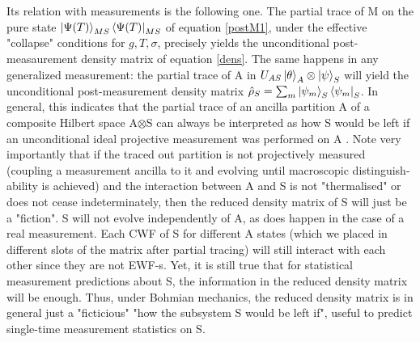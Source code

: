 \documentclass[11pt, a4paper]{article} %
\begin{document}
Its relation with measurements is the following one. The partial trace of M on the pure state $\ket{\Psi(T)}_{MS}\bra{\Psi(T)}_{MS}$ of equation \eqref{postM1}, under the effective "collapse" conditions for $g,T,\sigma$, precisely yields the unconditional post-measaurement density matrix of equation \eqref{dens}. The same happens in any generalized measurement: the partial trace of A in $U_{AS}\ket{\theta}_A\otimes\ket{\psi}_S$ will yield the unconditional post-measurement density matrix $\hat{\rho}_S=\sum_m \ket{\psi_m}_S\bra{\psi_m}_S$. In general, this indicates that the partial trace of an ancilla partition A of a composite Hilbert space A$\otimes$S can always be interpreted as how S would be left if an unconditional ideal projective measurement was performed on A \cite{Generalized}. Note very importantly that if the traced out partition is not projectively measured (coupling a measurement ancilla to it and evolving until macroscopic distinguish-ability is achieved) and the interaction between A and S is not "thermalised" or does not cease indeterminately, then the reduced density matrix of S will just be a "fiction". S will not evolve independently of A, as does happen in the case of a real measurement. Each CWF of S for different A states (which we placed in different slots of the matrix after partial tracing) will still interact with each other since they are not EWF-s. Yet, it is still true that for statistical measurement predictions about S, the information in the reduced density matrix will be enough. Thus, under Bohmian mechanics, the reduced density matrix is in general just a "ficticious" "how the subsystem S would be left if", useful to predict single-time measurement statistics on S. %
\end{document}
